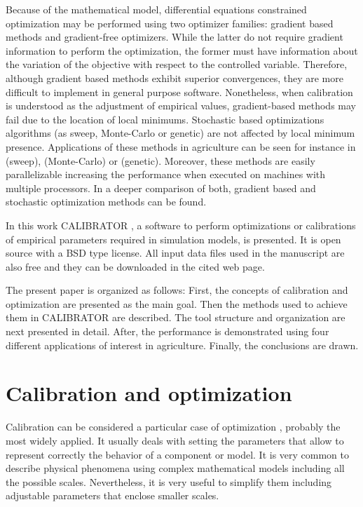 \documentclass[review,authoryear]{elsarticle}
\begin{document}
Because of the mathematical model, differential equations constrained
optimization may be performed using two optimizer families: gradient based
methods and gradient-free optimizers. While the latter do not require gradient
information to perform the optimization, the former must have information about
the variation of the objective with respect to the controlled variable.
Therefore, although gradient based methods exhibit superior convergences, they
are more difficult to implement in general purpose software. Nonetheless, when
calibration is understood as the adjustment of empirical values, gradient-based
methods may fail due to the location of local minimums. Stochastic based
optimizations algorithms (as sweep, Monte-Carlo or genetic) are not affected by
local minimum presence. Applications of these methods in agriculture can be seen
for instance in \citet{JaviSurcos2} (sweep),  \citet{Ouazaa15} (Monte-Carlo) or
\citet{Ebrahimiam13} (genetic). Moreover, these methods are easily
parallelizable increasing the performance when executed on machines with
multiple processors. In \cite{Lacasta15} a deeper comparison of both, gradient
based and stochastic optimization methods can be found.

In this work CALIBRATOR \citep{CalibratorGit}, a software to perform
optimizations or calibrations of empirical parameters required in simulation
models, is presented. It is open source with a BSD type license. All input data
files used in the manuscript are also free and they can be downloaded in the
cited web page.

The present paper is organized as follows: First, the concepts of calibration
and optimization are presented as the main goal. Then the methods used to
achieve them in CALIBRATOR are described. The tool structure and organization
are next presented in detail. After, the performance is demonstrated using
four different applications of interest in agriculture. Finally, the conclusions
are drawn.

\section{Calibration and optimization}

Calibration can be considered a particular case of optimization
\citep{WrightNocedal99}, probably the most widely applied. It usually deals with
setting the parameters that allow to represent correctly the behavior of a
component or model. It is very common to describe physical phenomena using
complex mathematical models including all the possible scales. Nevertheless, it
is very useful to simplify them including adjustable parameters that enclose
smaller scales.
\end{document}
